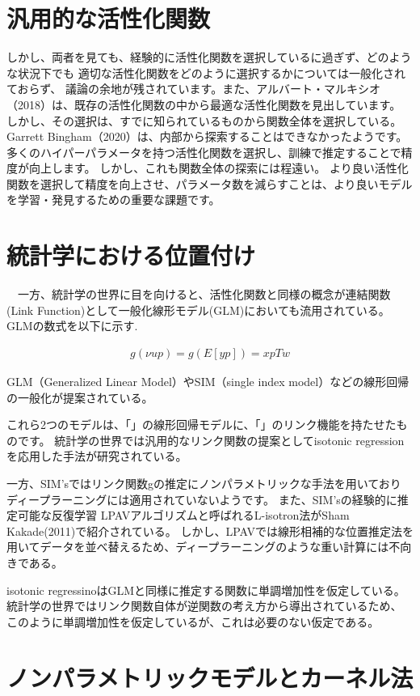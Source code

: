 \section{汎用的な活性化関数}


しかし、両者を見ても、経験的に活性化関数を選択しているに過ぎず、どのような状況下でも 適切な活性化関数をどのように選択するかについては一般化されておらず、
議論の余地が残されています。また、アルバート・マルキシオ（2018）は、既存の活性化関数の中から最適な活性化関数を見出しています。
しかし、その選択は、すでに知られているものから関数全体を選択している。Garrett Bingham（2020）は、内部から探索することはできなかったようです。
多くのハイパーパラメータを持つ活性化関数を選択し、訓練で推定することで精度が向上します。 しかし、これも関数全体の探索には程遠い。
より良い活性化関数を選択して精度を向上させ、パラメータ数を減らすことは、より良いモデルを学習・発見するための重要な課題です。


\section{統計学における位置付け}
　一方、統計学の世界に目を向けると、活性化関数と同様の概念が連結関数(Link Function)として一般化線形モデル(GLM)においても流用されている。
GLMの数式を以下に示す.



\begin{eqnarray}
g( \nu u p ) = g( E[yp] ) = xpTw
\end{eqnarray}

GLM（Generalized Linear Model）やSIM（single index model）などの線形回帰の一般化が提案されている。

これら2つのモデルは、「」の線形回帰モデルに、「」のリンク機能を持たせたものです。 
統計学の世界では汎用的なリンク関数の提案としてisotonic regressionを応用した手法が研究されている。


 一方、SIM'sではリンク関数gの推定にノンパラメトリックな手法を用いており ディープラーニングには適用されていないようです。
 また、SIM'sの経験的に推定可能な反復学習 LPAVアルゴリズムと呼ばれるL-isotron法がSham Kakade(2011)で紹介されている。 
 しかし、LPAVでは線形相補的な位置推定法を用いてデータを並べ替えるため、ディープラーニングのような重い計算には不向きである。 

isotonic regressinoはGLMと同様に推定する関数に単調増加性を仮定している。統計学の世界ではリンク関数自体が逆関数の考え方から導出されているため、
このように単調増加性を仮定しているが、これは必要のない仮定である。

\section{ノンパラメトリックモデルとカーネル法}

